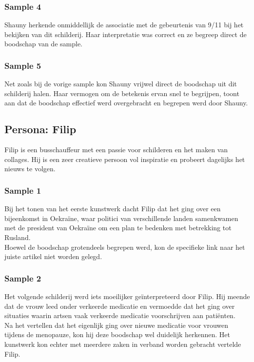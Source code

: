 \subsubsection{Sample 4}
Shauny herkende onmiddellijk de associatie met de gebeurtenis van 9/11 bij het bekijken van dit schilderij. Haar interpretatie was correct en ze begreep direct de boodschap van de sample.

\subsubsection{Sample 5}
Net zoals bij de vorige sample kon Shauny vrijwel direct de boodschap uit dit schilderij halen. Haar vermogen om de betekenis ervan snel te begrijpen, toont aan dat de boodschap effectief werd overgebracht en begrepen werd door Shauny.

\subsection{Persona: Filip}
Filip is een busschauffeur met een passie voor schilderen en het maken van collages. Hij is een zeer creatieve persoon vol inspiratie en probeert dagelijks het nieuws te volgen.

\subsubsection{Sample 1}
Bij het tonen van het eerste kunstwerk dacht Filip dat het ging over een bijeenkomst in Oekraïne, waar politici van verschillende landen samenkwamen met de president van Oekraïne om een plan te bedenken met betrekking tot Rusland. \\

Hoewel de boodschap grotendeels begrepen werd, kon de specifieke link naar het juiste artikel niet worden gelegd.

\subsubsection{Sample 2}
Het volgende schilderij werd iets moeilijker geïnterpreteerd door Filip. Hij meende dat de vrouw leed onder verkeerde medicatie en vermoedde dat het ging over situaties waarin artsen vaak verkeerde medicatie voorschrijven aan patiënten. \\

Na het vertellen dat het eigenlijk ging over nieuwe medicatie voor vrouwen tijdens de menopauze, kon hij deze boodschap wel duidelijk herkennen. Het kunstwerk kon echter met meerdere zaken in verband worden gebracht vertelde Filip.

